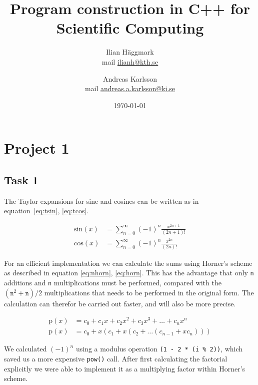 \documentclass[paper=a4, fontsize=11pt]{article} %
\title{Program construction in C++ for Scientific Computing}
\author{Ilian H{\"a}ggmark \\ mail \href{mailto:ilianh@kth.se}{ilianh@kth.se}
  \and Andreas Karlsson \\ mail \href{mailto:andreas.a.karlsson@ki.se}{andreas.a.karlsson@ki.se} }
\date{\normalsize\today} %
\begin{document}
\maketitle %

\section{Project 1}
\subsection{Task 1}

The Taylor expansions for sine and cosines can be written as in
equation~\ref{eq:tsin}, \ref{eq:tcos}.

\begin{align}
  \text{sin}(x) &= \sum\limits_{n=0}^\infty{(-1)^{n}\frac{x^{2n+1}}{(2n+1)!}} \label{eq:tsin}\\
  \text{cos}(x) &= \sum\limits_{n=0}^\infty{(-1)^{n}\frac{x^{2n}}{(2n)!}} \label{eq:tcos}
\end{align}

\noindent
For an efficient implementation we can calculate the sums using
Horner's scheme as described in equation \ref{eq:nhorn},
\ref{eq:horn}. This has the advantage that only \texttt{n} additions
and \texttt{n} multiplications must be performed, compared with the
$(\mathtt{n}^{2} + \mathtt{n}) / 2$ multiplications that needs to be performed in the
original form. The calculation can therefor be carried out faster, and
will also be more precise.

\begin{align}
  \text{p}(x) &= c_{0} + c_{1}x + c_{2}x^{2} + c_{3}x^{3} +\dots+c_{n}x^{n} \label{eq:nhorn}\\
  \text{p}(x) &= c_{0} + x(c_{1} + x(c_{2} + \dots (c_{n-1} + xc_{n}))) \label{eq:horn}
\end{align}

\noindent
We calculated $(-1)^n$ using a modulus operation
\lstinline$(1 - 2 * (i % 2))$, which saved us a more expensive
\lstinline$pow()$ call. After first calculating the factorial
explicitly we were able to implement it as a multiplying factor within
Horner's scheme.
\end{document}
